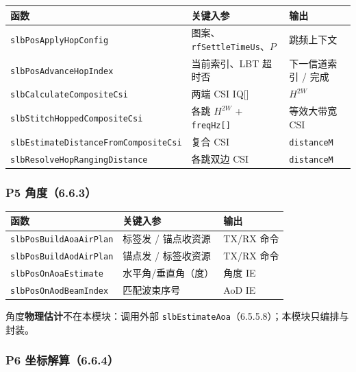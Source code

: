 \documentclass[11pt,a4paper]{ctexart}
\begin{document}
\begin{table}[h]
\centering
\small
\begin{tabular}{L{5.0cm}L{4.0cm}L{4.2cm}}
\toprule
\textbf{函数} & \textbf{关键入参} & \textbf{输出} \\
\midrule
\texttt{slbPosApplyHopConfig} & 图案、\texttt{rfSettleTimeUs}、$P$ & 跳频上下文 \\
\texttt{slbPosAdvanceHopIndex} & 当前索引、LBT 超时否 & 下一信道索引 / 完成 \\
\texttt{slbCalculateCompositeCsi} & 两端 CSI IQ[] & $H^{2W}$ \\
\texttt{slbStitchHoppedCompositeCsi} & 各跳 $H^{2W}$ + \texttt{freqHz[]} & 等效大带宽 CSI \\
\texttt{slbEstimateDistanceFromCompositeCsi} & 复合 CSI & \texttt{distanceM} \\
\texttt{slbResolveHopRangingDistance} & 各跳双边 CSI & \texttt{distanceM} \\
\bottomrule
\end{tabular}
\end{table}

\subsubsection{P5 角度（6.6.3）}

\begin{table}[h]
\centering
\small
\begin{tabular}{L{4.4cm}L{4.2cm}L{4.6cm}}
\toprule
\textbf{函数} & \textbf{关键入参} & \textbf{输出} \\
\midrule
\texttt{slbPosBuildAoaAirPlan} & 标签发 / 锚点收资源 & TX/RX 命令 \\
\texttt{slbPosBuildAodAirPlan} & 锚点发 / 标签收资源 & TX/RX 命令 \\
\texttt{slbPosOnAoaEstimate} & 水平角/垂直角（度） & 角度 IE \\
\texttt{slbPosOnAodBeamIndex} & 匹配波束序号 & AoD IE \\
\bottomrule
\end{tabular}
\end{table}

\noindent 角度\textbf{物理估计}不在本模块：调用外部 \texttt{slbEstimateAoa}（6.5.5.8）；本模块只编排与封装。

\subsubsection{P6 坐标解算（6.6.4）}
\end{document}
